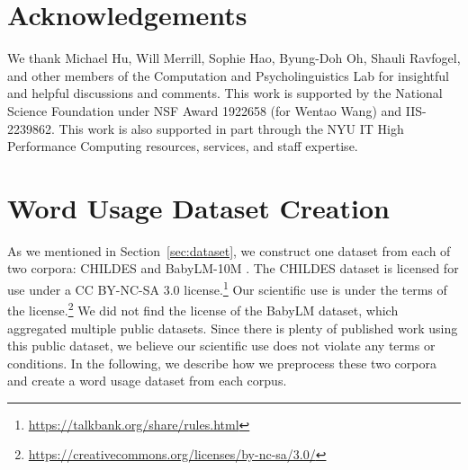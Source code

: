 \documentclass{article}
\begin{document}

\section*{Acknowledgements}
We thank Michael Hu, Will Merrill, Sophie Hao, Byung-Doh Oh, Shauli Ravfogel, and other members of the Computation and Psycholinguistics Lab for insightful and helpful discussions and comments.
This work is supported by the National Science Foundation under NSF Award 1922658 (for Wentao Wang) and IIS-2239862.
This work is also supported in part through the NYU IT High Performance Computing resources, services, and staff expertise.

\clearpage
{
    \small
    
}



\clearpage
\appendix
\section{Word Usage Dataset Creation}
\label{app:dataset}
As we mentioned in Section~\ref{sec:dataset}, we construct one dataset from each of two corpora: CHILDES \citep{CHILDES} and BabyLM-10M \citep{BabyLM}.
The CHILDES dataset is licensed for use under a CC BY-NC-SA 3.0 license.\footnote{\url{https://talkbank.org/share/rules.html}} Our scientific use is under the terms of the license.\footnote{\url{https://creativecommons.org/licenses/by-nc-sa/3.0/}}
We did not find the license of the BabyLM dataset, which aggregated multiple public datasets. Since there is plenty of published work using this public dataset, we believe our scientific use does not violate any terms or conditions.
In the following, we describe how we preprocess these two corpora and create a word usage dataset from each corpus.
\end{document}

